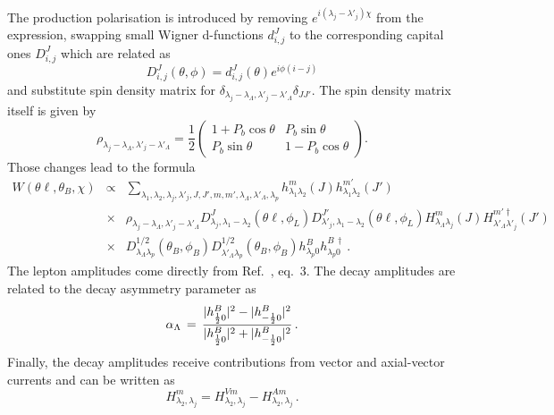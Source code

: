 The production polarisation is introduced by removing
$e^{i(\lambda_{j}-\lambda'_{j})\chi}$ from the expression, swapping small Wigner d-functions
$d^J_{i,j}$ to the corresponding capital ones $D^J_{i,j}$ which are related as
\begin{equation}
D^J_{i,j}(\theta,\phi)=d^J_{i,j}(\theta)e^{i\phi(i-j)}
\end{equation}
and substitute spin density matrix for
$\delta_{\lambda_{j}-\lambda_{\Lambda},\lambda'_{j}-\lambda'_{\Lambda}}\delta_{JJ'}$. The spin density matrix
itself is given by
\begin{equation}
\label{eq:spinDensity}
\rho_{\lambda_{j}-\lambda_{\Lambda},\lambda'_{j}-\lambda'_{\Lambda}}=
\frac{1}{2}\left(\begin{array}{cc} 1+P_b\cos\theta & P_b\sin\theta \\ P_b\sin\theta &
1-P_b\cos\theta \end{array}\right).
\end{equation}
Those changes lead to the formula
\begin{eqnarray}
W(\theta\ell,\theta_{B},\chi)  &\propto& 
\sum_{\lambda_1,\lambda_{2},\lambda_j,\lambda'_j,J,J',m,m',\lambda_{\Lambda},
\lambda'_{\Lambda},\lambda_{p}} 
h^{m}_{\lambda_1\lambda_2}(J)h^{m'}_{\lambda_1\lambda_2}(J')
\nonumber\\ 
&\times&
\rho_{\lambda_{j}-\lambda_{\Lambda},\lambda'_{j}-\lambda'_{\Lambda}}
D^J_{\lambda_j,\lambda_1-\lambda_{2}}(\theta\ell,\phi_L)
D^{J'}_{\lambda'_j,\lambda_1-\lambda_{2}}(\theta\ell,\phi_L)
H^{m}_{\lambda_{\Lambda}\lambda_{j}}(J)
H^{m'\dagger}_{\lambda'_{\Lambda}\lambda'_{j}}(J')
\nonumber \\
&\times& 
D^{1/2}_{\lambda_{\Lambda}\lambda_{p}}(\theta_{B},\phi_B)
D^{1/2}_{\lambda'_{\Lambda}\lambda_{p}}(\theta_{B},\phi_B)
h^{B}_{\lambda_{p}0}h^{B\,\dagger}_{\lambda_{p}0}\,.
\end{eqnarray}
The lepton amplitudes come directly from Ref.~\cite{Gutsche:2013pp}, eq.~3.
The \Lz decay amplitudes are related to the \Lz decay asymmetry parameter as
\begin{equation}
\alpha_{\Lambda}\,=\,\frac{|h^{B}_{{\frac{1}{2}}0}|^{2}-
|h^{B}_{-{\frac{1}{2}}0}|^{2}}
{|h^{B}_{{\frac{1}{2}}0}|^{2}
+|h^{B}_{-{\frac{1}{2}}0}|^{2}}\,.
\end{equation}
Finally, the \Lb decay amplitudes receive contributions from vector and axial-vector currents
 and can be written as
\begin{equation}
H^m_{\lambda_2,\lambda_j} = H^{Vm}_{\lambda_2,\lambda_j}
                          - H^{Am}_{\lambda_2,\lambda_j}\,.
\end{equation}
